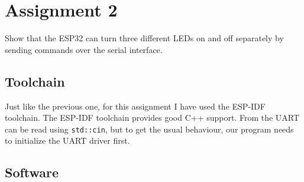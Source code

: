\section{Assignment 2}
Show that the ESP32 can turn three different LEDs on and off separately by sending commands over the serial interface.

\subsection{Toolchain}
Just like the previous one, for this assignment I have used the ESP-IDF toolchain.
The ESP-IDF toolchain provides good C++ support.
From the UART can be read using \texttt{std::cin}, but to get the usual behaviour, our program needs to initialize the UART driver first.

\clearpage
\subsection{Software}
\inputminted{cpp}{../leds-uart/main/leds-uart.cpp}

